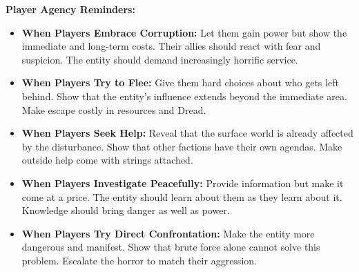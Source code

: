 \documentclass[11pt]{article}
\begin{document}
\textbf{Player Agency Reminders:}
\begin{itemize}
\item \textbf{When Players Embrace Corruption:} Let them gain power but show the immediate and long-term costs. Their allies should react with fear and suspicion. The entity should demand increasingly horrific service.
\item \textbf{When Players Try to Flee:} Give them hard choices about who gets left behind. Show that the entity's influence extends beyond the immediate area. Make escape costly in resources and Dread.
\item \textbf{When Players Seek Help:} Reveal that the surface world is already affected by the disturbance. Show that other factions have their own agendas. Make outside help come with strings attached.
\item \textbf{When Players Investigate Peacefully:} Provide information but make it come at a price. The entity should learn about them as they learn about it. Knowledge should bring danger as well as power.
\item \textbf{When Players Try Direct Confrontation:} Make the entity more dangerous and manifest. Show that brute force alone cannot solve this problem. Escalate the horror to match their aggression.
\end{itemize}
\end{document}
